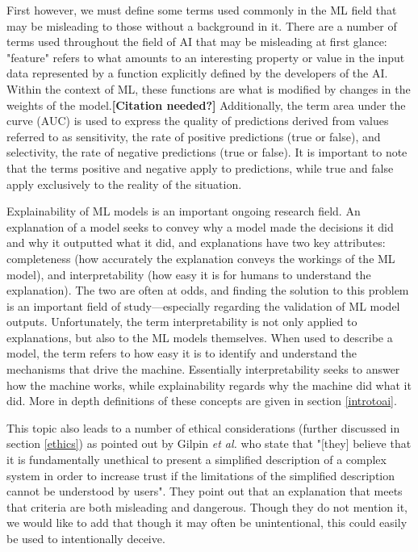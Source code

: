 \documentclass[]{article}
\begin{document}
		First however, we must define some terms used commonly in the ML field that may be misleading to those without a background in it. There are a number of terms used throughout the field of AI that may be misleading at first glance: "feature" refers to what amounts to an interesting property or value in the input data represented by a function explicitly defined by the developers of the AI. Within the context of ML, these functions are what is modified by changes in the weights of the model.\textbf{[Citation needed?]} Additionally, the term area under the curve (AUC) is used to express the quality of predictions derived from values referred to as sensitivity, the rate of positive predictions (true or false), and selectivity, the rate of negative predictions (true or false). It is important to note that the terms positive and negative apply to predictions, while true and false apply exclusively to the reality of the situation.\cite{introtoauc}

		Explainability of ML models is an important ongoing research field. An explanation of a model seeks to convey why a model made the decisions it did and why it outputted what it did, and explanations have two key attributes: completeness (how accurately the explanation conveys the workings of the ML model), and interpretability (how easy it is for humans to understand the explanation). The two are often at odds, and finding the solution to this problem is an important field of study\cite{8631448}---especially regarding the validation of ML model outputs.\cite{10.1145/3328519.3329126} Unfortunately, the term interpretability is not only applied to explanations, but also to the ML models themselves. When used to describe a model, the term refers to how easy it is to identify and understand the mechanisms that drive the machine. Essentially interpretability seeks to answer how the machine works, while explainability regards why the machine did what it did.\cite{8631448} More in depth definitions of these concepts are given in section \ref{introtoai}.

		This topic also leads to a number of ethical considerations (further discussed in section \ref{ethics}) as pointed out by Gilpin \emph{et al.} who state that "[they] believe that it is fundamentally unethical to present a simplified description of a complex system in order to increase trust if the limitations of the simplified description cannot be understood by users". They point out that an explanation that meets that criteria are both misleading and dangerous.\cite{8631448} Though they do not mention it, we would like to add that though it may often be unintentional, this could easily be used to intentionally deceive. 
		
\end{document}
